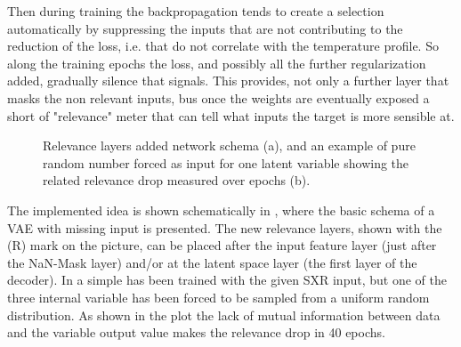 Then during training the backpropagation tends to create a selection automatically by suppressing the inputs that are not contributing to the reduction of the loss, i.e. that do not correlate with the temperature profile.
So along the training epochs the loss, and possibly all the further regularization added, gradually silence that signals. This provides, not only a further layer that masks the non relevant inputs, bus once the weights are eventually exposed a short of "relevance" meter that can tell what inputs the target is more sensible at.
%
\begin{figure}
    \centering
    \caption{Relevance layers added network schema (a), and an example of pure random number forced as input for one  latent variable showing the related relevance drop measured over epochs (b). }
    \label{fig:relevance}
\end{figure}
%
The implemented idea is shown schematically in \Figure{\ref{fig:relevance_schema}}, where the basic schema of a VAE with missing input is presented. The new relevance layers, shown with the (R) mark on the picture, can be placed after the input feature layer (just after the NaN-Mask layer) and/or at the latent space layer (the first layer of the decoder).
In \Figure{\ref{fig:relevance_drop}} a simple  has been trained with the given SXR input, but one of the three internal variable has been forced to be sampled from a uniform random distribution. As shown in the plot the lack of mutual information between data and the variable output value makes the relevance drop in 40 epochs.
